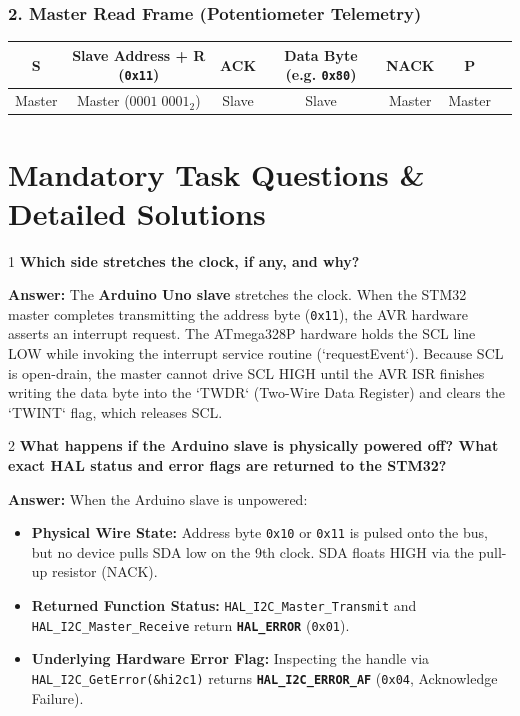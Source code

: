 \documentclass[11pt,a4paper]{article}
\begin{document}
\subsubsection*{2. Master Read Frame (Potentiometer Telemetry)}
\begin{center}
\small
\begin{tabular}{|c|c|c|c|c|c|c|}
\hline
\textbf{S} & \textbf{Slave Address + R (\texttt{0x11})} & \textbf{ACK} & \textbf{Data Byte (e.g. \texttt{0x80})} & \textbf{NACK} & \textbf{P} \\
\hline
Master & Master ($0001\;0001_2$) & Slave & Slave & Master & Master \\
\hline
\end{tabular}
\end{center}

\section{Mandatory Task Questions \& Detailed Solutions}

\begin{questionbox}{1}
\textbf{Which side stretches the clock, if any, and why?}
\end{questionbox}
\textbf{Answer:} The \textbf{Arduino Uno slave} stretches the clock. When the STM32 master completes transmitting the address byte (\texttt{0x11}), the AVR hardware asserts an interrupt request. The ATmega328P hardware holds the SCL line LOW while invoking the interrupt service routine (`requestEvent`). Because SCL is open-drain, the master cannot drive SCL HIGH until the AVR ISR finishes writing the data byte into the `TWDR` (Two-Wire Data Register) and clears the `TWINT` flag, which releases SCL.

\begin{questionbox}{2}
\textbf{What happens if the Arduino slave is physically powered off? What exact HAL status and error flags are returned to the STM32?}
\end{questionbox}
\textbf{Answer:} When the Arduino slave is unpowered:
\begin{itemize}
    \item \textbf{Physical Wire State:} Address byte \texttt{0x10} or \texttt{0x11} is pulsed onto the bus, but no device pulls SDA low on the 9th clock. SDA floats HIGH via the pull-up resistor (NACK).
    \item \textbf{Returned Function Status:} \texttt{HAL\_I2C\_Master\_Transmit} and \texttt{HAL\_I2C\_Master\_Receive} return \textbf{\texttt{HAL\_ERROR}} (\texttt{0x01}).
    \item \textbf{Underlying Hardware Error Flag:} Inspecting the handle via \texttt{HAL\_I2C\_GetError(\&hi2c1)} returns \textbf{\texttt{HAL\_I2C\_ERROR\_AF}} (\texttt{0x04}, Acknowledge Failure).
\end{itemize}
\end{document}
